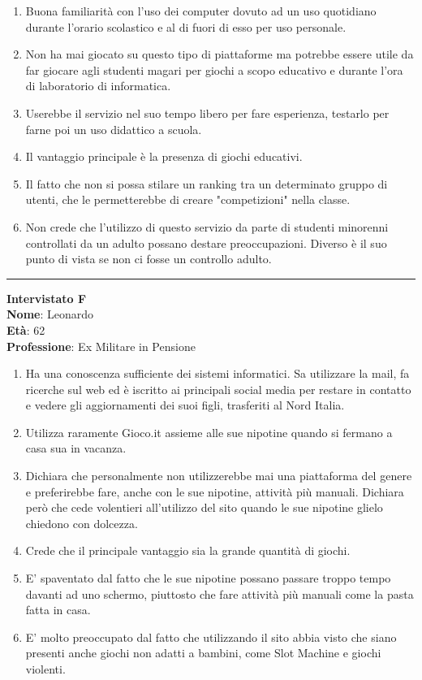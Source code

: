 \documentclass[../Report.tex]{subfiles}
\begin{document}
    \begin{enumerate}
        \item Buona familiarità con l’uso dei computer dovuto ad un uso quotidiano durante l’orario scolastico e al di fuori di esso per uso personale.
        \item Non ha mai giocato su questo tipo di piattaforme ma potrebbe essere utile da far giocare agli studenti magari per giochi a scopo educativo e durante l’ora di laboratorio di informatica.
        \item Userebbe il servizio nel suo tempo libero per fare esperienza, testarlo per farne poi un uso didattico a scuola.
        \item Il vantaggio principale è la presenza di giochi educativi.
        \item Il fatto che non si possa stilare un ranking tra un determinato gruppo di utenti, che le permetterebbe di creare "competizioni" nella classe.
        \item Non crede che l’utilizzo di questo servizio da parte di studenti minorenni controllati da un adulto possano destare preoccupazioni. Diverso è il suo punto di vista se non ci fosse un controllo adulto. 
    \end{enumerate}
    
    \hrule
    \vspace{0.5cm}
    \textbf{Intervistato F}\\
    \textbf{Nome}: Leonardo \\
    \textbf{Età}: 62\\
    \textbf{Professione}: Ex Militare in Pensione

    \begin{enumerate}
        \item Ha una conoscenza sufficiente dei sistemi informatici. Sa utilizzare la mail, fa ricerche sul web ed è iscritto ai principali social media per restare in contatto e vedere gli aggiornamenti dei suoi figli, trasferiti al Nord Italia. 
        \item Utilizza raramente Gioco.it assieme alle sue nipotine quando si fermano a casa sua in vacanza. 
        \item Dichiara che personalmente non utilizzerebbe mai una piattaforma del genere e preferirebbe fare, anche con le sue nipotine, attività più manuali. Dichiara però che cede volentieri all'utilizzo del sito quando le sue nipotine glielo chiedono con dolcezza. 
        \item Crede che il principale vantaggio sia la grande quantità di giochi. 
        \item E' spaventato dal fatto che le sue nipotine possano passare troppo tempo davanti ad uno schermo, piuttosto che fare attività più manuali come la pasta fatta in casa. 
        \item E' molto preoccupato dal fatto che utilizzando il sito abbia visto che siano presenti anche giochi non adatti a bambini, come Slot Machine e giochi violenti.    
    \end{enumerate}
    
\end{document}
